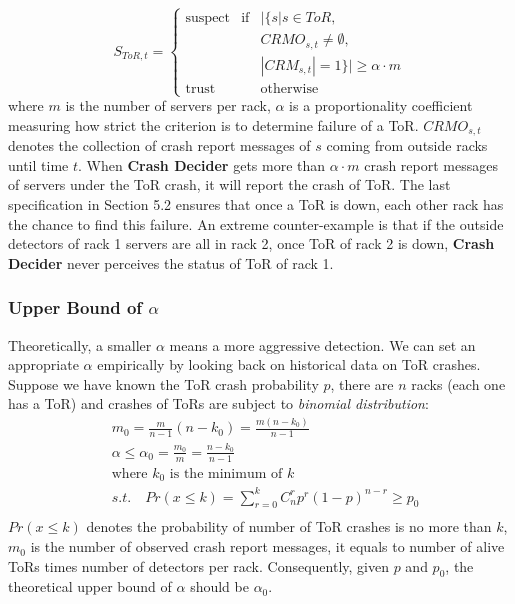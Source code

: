 \documentclass{sig-alternate-05-2015}
\begin{document}
\begin{equation}
S_{ToR,t}=\left\{
    \begin{array}{lcl}
    \text{suspect} & \text{if} & | \{s | s \in ToR, \\
    && CRMO_{s,t} \not = \emptyset, \\
    && |CRM_{s,t}|=1\} | \geq \alpha \cdot m \\

    \text{trust} && \text{otherwise}
    \end{array}
\right.
\end{equation}
where $m$ is the number of servers per rack, $\alpha$ is a  proportionality coefficient measuring how strict the criterion is to determine failure of a ToR. $CRMO_{s,t}$ denotes the collection of crash report messages of $s$ coming from outside racks until time $t$. When \textbf{Crash Decider} gets more than $\alpha \cdot m$ crash report messages of servers under the ToR crash, it will report the crash of ToR. The last specification in Section 5.2 ensures that once a ToR is down, each other rack has the chance to find this failure. An extreme counter-example is that if the outside detectors of rack 1 servers are all in rack 2, once ToR of rack 2 is down, \textbf{Crash Decider} never perceives the status of ToR of rack 1.

\subsubsection*{Upper Bound of $\alpha$}
Theoretically, a smaller $\alpha$ means a more aggressive detection. We can set an appropriate $\alpha$ empirically by looking back on historical data on ToR crashes. Suppose we have known the ToR crash probability $p$, there are $n$ racks (each one has a ToR) and crashes of ToRs are subject to \textit{binomial distribution}:
\begin{equation}
    \begin{aligned}
        &m_0  = \frac{m}{n-1}(n-k_0) = \frac{m(n-k_0)}{n-1}\\
        &\alpha \leq \alpha_0  = \frac{m_0}{m} = \frac{n-k_0}{n-1}\\
        &\text{where } k_0 \text{ is the minimum of } k\\
        & s.t. \quad Pr(x\leq k) = \sum_{r=0}^k C_n^r p^r(1-p)^{n-r} \geq p_0 \\
    \end{aligned}
\end{equation}
$Pr(x\leq k)$ denotes the probability of number of ToR crashes is no more than $k$, $m_0$ is the number of observed crash report messages, it equals to number of alive ToRs times number of detectors per rack. Consequently, given $p$ and $p_0$, the theoretical upper bound of $\alpha$ should be $\alpha_0$.
 
\end{document}
